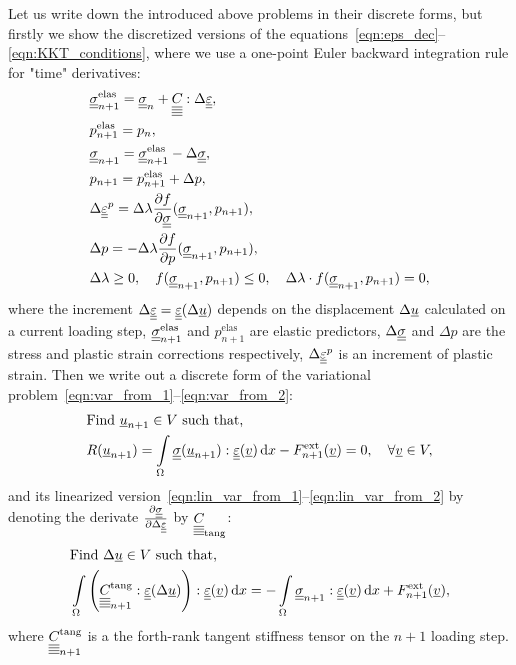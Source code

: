 \documentclass[12pt]{article}
\begin{document}
Let us write down the introduced above problems in their discrete forms, but firstly we show the discretized versions of the equations~\eqref{eqn:eps_dec}--\eqref{eqn:KKT_conditions}, where we use a one-point Euler backward integration rule for "time" derivatives:
\begin{align}
    & \uusigmanelas = \uusigma_n + \uuuuC{} : \Delta\uueps \label{eqn:return_mapping_begin},\\
    & p_{n+1}^\text{elas} = p_n, \\
    & \uusigman = \uusigmanelas - \Delta\uusigma, \\
    & p_{n+1} = p_{n+1}^\text{elas} + \Delta p, \\%
    & \Delta\uueps^p = \Delta\lambda\frac{\partial f}{\partial \uusigma} (\uusigman, p_{n+1}), \\
    & \Delta p = -\Delta\lambda\frac{\partial f}{\partial p} (\uusigman, p_{n+1}), \\
    & \Delta\lambda \geq 0, \quad f(\uusigman, p_{n+1}) \leq 0, \quad \Delta\lambda\cdot f(\uusigman, p_{n+1}) = 0, \label{eqn:return_mapping_end}
\end{align}
where the increment $\Delta\underline{\underline{\varepsilon}} = \underline{\underline{\varepsilon}}(\Delta\underline{u})$ depends on the displacement $\Delta\underline{u}$ calculated on a current loading step, $\underline{\underline{\sigma}}_{n+1}^{\text{elas}}$ and $p_{n+1}^\text{elas}$ are elastic predictors, $\Delta\underline{\underline{\sigma}}$ and $\Delta p$ are the stress and plastic strain corrections respectively, $\Delta\underline{\underline{\varepsilon}}^p$ is an increment of plastic strain. 
Then we write out a discrete form of the variational problem~\eqref{eqn:var_from_1}--\eqref{eqn:var_from_2}:
\begin{align}
    & \text{Find } \underline{u}_{n+1} \in V \text{ such that,} \label{eqn:var_disc_from_1} \\ 
    & R(\underline{u}_{n+1}) = \int\limits_\Omega\underline{\underline{\sigma}}(\underline{u}_{n+1}) : \underline{\underline{\varepsilon}}(\underline{v}) \, \mathrm{d} x - F_{n+1}^\text{ext}(\underline{v}) = 0, \quad \forall \underline{v} \in V \label{eqn:var_disc_from_2},
\end{align}
and its linearized version~\eqref{eqn:lin_var_from_1}--\eqref{eqn:lin_var_from_2} by denoting the derivate $\frac{\partial\underline{\underline{\sigma}}}{\partial\Delta\underline{\underline{\varepsilon}}}$ by $\underline{\underline{\underline{\underline{C_{}}}}}_{\text{tang}}$:
\begin{align}
    & \text{Find } \Delta\underline{u} \in V \text{ such that,} \label{eqn:lin_var_disc_from_1} \\ 
    & \int\limits_\Omega \left(\underline{\underline{\underline{\underline{C_{}}}}}_{n+1}^\text{tang} : \underline{\underline{\varepsilon}}(\Delta\underline{u})\right) : \underline{\underline{\varepsilon}}(\underline{v}) \, \mathrm{d} x = -\int\limits_\Omega\underline{\underline{\sigma}}_{n+1} : \underline{\underline{\varepsilon}}(\underline{v}) \, \mathrm{d} x + F^\text{ext}_{n+1}(\underline{v}) \label{eqn:lin_var_disc_from_2},
\end{align}
where $\underline{\underline{\underline{\underline{C_{}}}}}_{n+1}^{\text{tang}}$ is a the forth-rank tangent stiffness tensor on the $n+1$ loading step.
\end{document}
